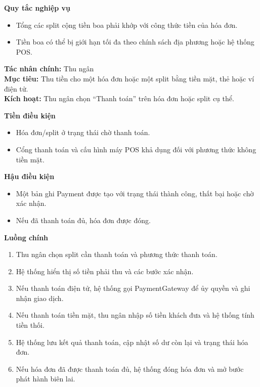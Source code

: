 \documentclass[11pt,a4paper]{article}
\begin{document}
\begin{usecasebox}[title={UC-BIL-02 --- Tách hóa đơn và thêm tiền boa}]
    \textbf{Quy tắc nghiệp vụ}
    \begin{itemize}[leftmargin=1.8em]
  \item Tổng các split cộng tiền boa phải khớp với công thức tiền của hóa đơn.
  \item Tiền boa có thể bị giới hạn tối đa theo chính sách địa phương hoặc hệ thống POS.
\end{itemize}
    \end{usecasebox}



    \begin{usecasebox}[title={UC-PAY-01 --- Xử lý thanh toán}]
    \textbf{Tác nhân chính:} Thu ngân\\
    \textbf{Mục tiêu:} Thu tiền cho một hóa đơn hoặc một split bằng tiền mặt, thẻ hoặc ví điện tử.\\
    \textbf{Kích hoạt:} Thu ngân chọn \enquote{Thanh toán} trên hóa đơn hoặc split cụ thể.

    \medskip
    \textbf{Tiền điều kiện}
    \begin{itemize}[leftmargin=1.8em]
  \item Hóa đơn/split ở trạng thái chờ thanh toán.
  \item Cổng thanh toán và cấu hình máy POS khả dụng đối với phương thức không tiền mặt.
\end{itemize}

    \textbf{Hậu điều kiện}
    \begin{itemize}[leftmargin=1.8em]
  \item Một bản ghi \textsf{Payment} được tạo với trạng thái thành công, thất bại hoặc chờ xác nhận.
  \item Nếu đã thanh toán đủ, hóa đơn được đóng.
\end{itemize}

    \textbf{Luồng chính}
    \begin{enumerate}[leftmargin=1.8em]
  \item Thu ngân chọn split cần thanh toán và phương thức thanh toán.
  \item Hệ thống hiển thị số tiền phải thu và các bước xác nhận.
  \item Nếu thanh toán điện tử, hệ thống gọi \textsf{PaymentGateway} để ủy quyền và ghi nhận giao dịch.
  \item Nếu thanh toán tiền mặt, thu ngân nhập số tiền khách đưa và hệ thống tính tiền thối.
  \item Hệ thống lưu kết quả thanh toán, cập nhật số dư còn lại và trạng thái hóa đơn.
  \item Nếu hóa đơn đã được thanh toán đủ, hệ thống đóng hóa đơn và mở bước phát hành biên lai.
\end{enumerate}


\end{usecasebox}
\end{document}
